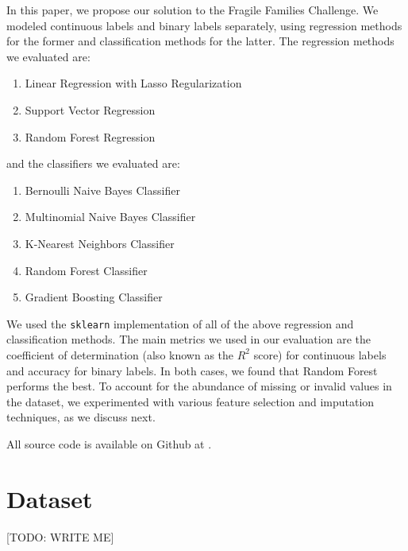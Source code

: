 \documentclass{article} %
\begin{document}
In this paper, we propose our solution to the Fragile Families Challenge. We modeled continuous labels and binary labels separately, using regression methods for the former and classification methods for the latter. The regression methods we evaluated are:

\begin{enumerate}
\item Linear Regression with Lasso Regularization
\item Support Vector Regression
\item Random Forest Regression
\end{enumerate}
and the classifiers we evaluated are:
\begin{enumerate}
\item Bernoulli Naive Bayes Classifier
\item Multinomial Naive Bayes Classifier
\item K-Nearest Neighbors Classifier
\item Random Forest Classifier
\item Gradient Boosting Classifier
\end{enumerate}

We used the \texttt{sklearn} implementation of all of the above regression and classification methods. The main metrics we used in our evaluation are the coefficient of determination (also known as the $R^2$ score) for continuous labels and accuracy for binary labels. In both cases, we found that Random Forest performs the best. To account for the abundance of missing or invalid values in the dataset, we experimented with various feature selection and imputation techniques, as we discuss next.

All source code is available on Github at \cite{myrepo}.

\section{Dataset}
\label{sec:dataset}

[TODO: WRITE ME]

\end{document}
